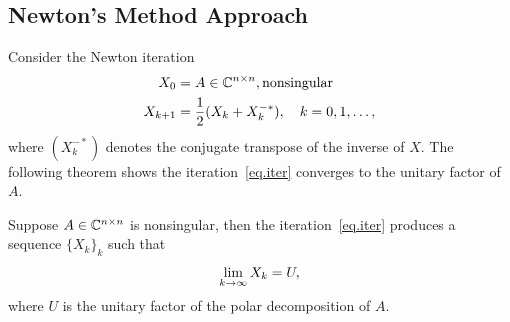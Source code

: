 \subsection{Newton's Method Approach}

Consider the Newton iteration~
\begin{equation}\label{eq.iter}
    \begin{aligned}
        X_0 &= A\in\mathbb{C}^{n\times n}, \text{nonsingular}\\
        X_{k+1} &= \frac{1}{2}(X_k + X_k^{-*}),\quad k = 0,1,\dots,
    \end{aligned}
\end{equation}
where $(X_k^{-*})$ denotes the conjugate transpose of the inverse of $X$. The following theorem shows the iteration~\eqref{eq.iter} converges to the unitary factor of $A$.
\begin{theorem}
    \label{thm.newton-iteration}
    Suppose $A\in\mathbb{C}^{n\times n}$ is nonsingular, then the iteration~\eqref{eq.iter} produces a sequence $\{X_k\}_k$ such that 
    \begin{equation}\notag
        \lim_{k\to\infty} X_k = U,
    \end{equation}
    where $U$ is the unitary factor of the polar decomposition of $A$.
\end{theorem}

